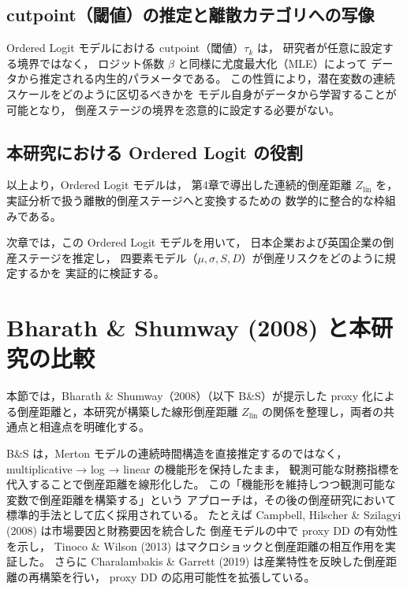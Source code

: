 \subsection{cutpoint（閾値）の推定と離散カテゴリへの写像}

Ordered Logit モデルにおける cutpoint（閾値）$\tau_k$ は，
研究者が任意に設定する境界ではなく，
ロジット係数 $\beta$ と同様に尤度最大化（MLE）によって
データから推定される内生的パラメータである。
この性質により，潜在変数の連続スケールをどのように区切るべきかを
モデル自身がデータから学習することが可能となり，
倒産ステージの境界を恣意的に設定する必要がない。

\subsection{本研究における Ordered Logit の役割}

以上より，Ordered Logit モデルは，
第4章で導出した連続的倒産距離 $Z_{\text{lin}}$ を，
実証分析で扱う離散的倒産ステージへと変換するための
数学的に整合的な枠組みである。

次章では，この Ordered Logit モデルを用いて，
日本企業および英国企業の倒産ステージを推定し，
四要素モデル（$\mu, \sigma, S, D$）が倒産リスクをどのように規定するかを
実証的に検証する。


\section{Bharath \& Shumway (2008) と本研究の比較}
\label{sec:bs_comparison}

本節では，Bharath \& Shumway（2008）（以下 B\&S）が提示した
proxy 化による倒産距離と，本研究が構築した線形倒産距離
$Z_{\text{lin}}$ の関係を整理し，両者の共通点と相違点を明確化する。

B\&S は，Merton モデルの連続時間構造を直接推定するのではなく，
multiplicative → log → linear の機能形を保持したまま，
観測可能な財務指標を代入することで倒産距離を線形化した。
この「機能形を維持しつつ観測可能な変数で倒産距離を構築する」という
アプローチは，その後の倒産研究において標準的手法として広く採用されている。
たとえば Campbell, Hilscher \& Szilagyi (2008) は市場要因と財務要因を統合した
倒産モデルの中で proxy DD の有効性を示し，
Tinoco \& Wilson (2013) はマクロショックと倒産距離の相互作用を実証した。
さらに Charalambakis \& Garrett (2019) は産業特性を反映した倒産距離の再構築を行い，
proxy DD の応用可能性を拡張している。

